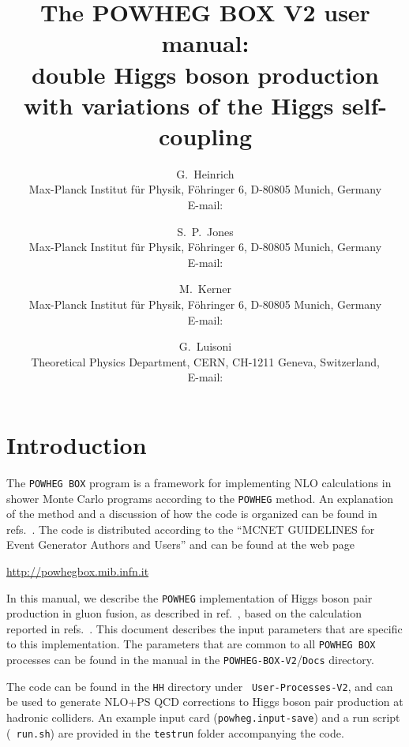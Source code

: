 \documentclass[paper]{JHEP3}
\title{The POWHEG BOX V2 user manual:\\
  double Higgs boson production with variations of the Higgs self-coupling} \vfill
\author{G.~Heinrich\\ 
  Max-Planck Institut f{\"u}r Physik, F\"ohringer 6, D-80805 Munich, Germany\\
  E-mail: \email{gudrun@mpp.mpg.de}
}
\author{S.~P.~Jones \\ 
  Max-Planck Institut f{\"u}r Physik, F\"ohringer 6, D-80805 Munich, Germany\\
  E-mail: \email{sjones@mpp.mpg.de}
}
\author{M.~Kerner \\ 
  Max-Planck Institut f{\"u}r Physik, F\"ohringer 6, D-80805 Munich, Germany\\
  E-mail: \email{kerner@mpp.mpg.de}
}
\author{G.~Luisoni\\
  Theoretical Physics Department, CERN, CH-1211 Geneva, Switzerland,\\
  E-mail: \email{gionata.luisoni@cern.ch}
}
\newcommand\POWHEG{{\tt POWHEG}}
\newcommand\POWHEGBOX{{\tt POWHEG BOX}}
\newcommand\POWHEGBOXV{{\tt POWHEG-BOX-V2}}
\begin{document}
\section{Introduction}

The \POWHEGBOX{} program is a framework for implementing NLO
calculations in shower Monte Carlo programs according to the \POWHEG{}
method. An explanation of the method and a discussion of how the code
is organized can be found in
refs.~\cite{Nason:2004rx,Frixione:2007vw,Alioli:2010xd,Jezo:2015aia}.
The code is distributed according to the ``MCNET GUIDELINES for Event
Generator Authors and Users'' and can be found at the web page
%
\begin{center}
 \url{http://powhegbox.mib.infn.it}
\end{center}
%
In this manual, we describe the \POWHEG{} implementation of Higgs
boson pair production in gluon fusion, as described in
ref.~\cite{Heinrich:2017kxx}, based on the calculation reported in
refs.~\cite{Borowka:2016ehy,Borowka:2016ypz}.  This document describes
the input parameters that are specific to this implementation. The
parameters that are common to all \POWHEGBOX{} processes can be found
in the manual in the \POWHEGBOXV{}/{\tt Docs} directory.

The code can be found in the {\tt HH} directory under {\tt
  User-Processes-V2}, and can be used to generate NLO+PS QCD
corrections to Higgs boson pair production at hadronic colliders. An
example input card ({\tt powheg.input-save}) and a run script ({\tt
  run.sh}) are provided in the {\tt testrun} folder accompanying the
code.
\end{document}

